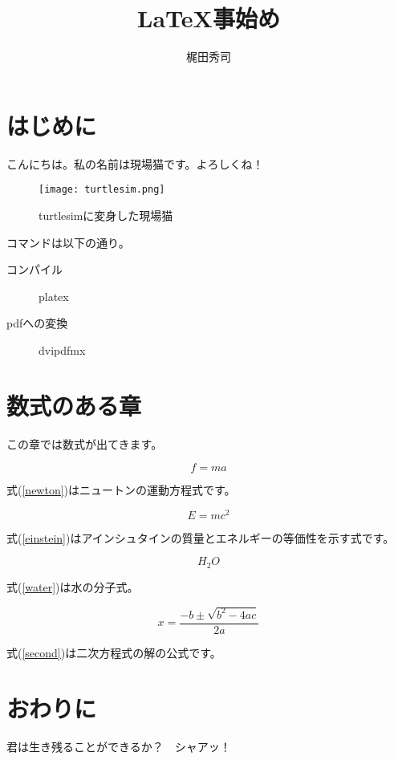 \documentclass[12pt,epsf]{jarticle}
\begin{document}
\title{LaTeX事始め}
\author{梶田秀司}
\maketitle

\section{はじめに}
こんにちは。私の名前は現場猫です。よろしくね！

\begin{figure}[h]
 \centering
 \texttt{[image: turtlesim.png]}
 \caption{turtlesimに変身した現場猫}
 \end{figure}
 
コマンドは以下の通り。
 \begin{description}
 \item[コンパイル] platex
 \item[pdfへの変換] dvipdfmx
 \end{description}
 
 
 \section{数式のある章}
 
 この章では数式が出てきます。
 
 \begin{equation}
 f = ma     \label{newton}
 \end{equation}
 
 式(\ref{newton})はニュートンの運動方程式です。
 
 \begin{equation}
 E = mc^2   \label{einstein}
 \end{equation}
 
 式(\ref{einstein})はアインシュタインの質量とエネルギーの等価性を示す式です。
 
 \begin{equation}
 H_2 O    \label{water}
 \end{equation}
 
 式(\ref{water})は水の分子式。
 
 \begin{equation}
 x = \frac{-b\pm \sqrt{b^2 - 4ac}}{2a}   \label{second}
 \end{equation}
 
 式(\ref{second})は二次方程式の解の公式です。
 \section{おわりに}
 君は生き残ることができるか？　シャアッ！
\end{document}
